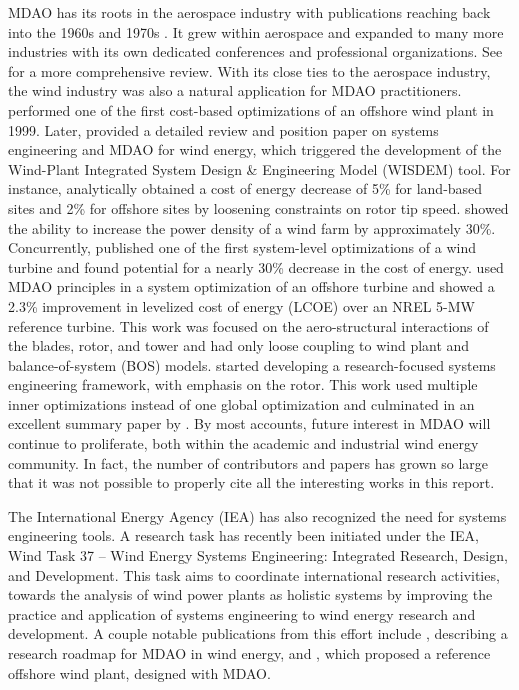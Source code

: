 MDAO has its roots in the aerospace industry with publications reaching
back into the 1960s and 1970s \citep{schmit60, haftka1977}. It grew
within aerospace and expanded to many more industries with its own
dedicated conferences and professional organizations. See
\citet{martins2013} for a more comprehensive review. With its close ties
to the aerospace industry, the wind industry was also a natural
application for MDAO practitioners. \citet{kuhn99} performed one of the
first cost-based optimizations of an offshore wind plant in 1999. Later,
\citet{dykes2011} provided a detailed review and position paper on
systems engineering and MDAO for wind energy, which triggered the
development of the Wind-Plant Integrated System Design \& Engineering
Model (WISDEM) tool. For instance, \citet{ning2014} analytically
obtained a cost of energy decrease of 5\% for land-based sites and 2\%
for offshore sites by loosening constraints on rotor tip
speed. \citet{fleming2016} showed the ability to increase the power
density of a wind farm by approximately 30\%. Concurrently,
\citet{maki2012} published one of the first system-level optimizations
of a wind turbine and found potential for a nearly 30\% decrease in the
cost of energy. \citet{ashuri2014} used MDAO principles in a system
optimization of an offshore turbine and showed a 2.3\% improvement in
levelized cost of energy (LCOE) over an NREL 5-MW reference
turbine. This work was focused on the aero-structural interactions of
the blades, rotor, and tower and had only loose coupling to wind plant
and balance-of-system (BOS) models.  \citet{bottasso2012} started
developing a research-focused systems engineering framework, with
emphasis on the rotor.  This work used multiple inner optimizations
instead of one global optimization and culminated in an excellent
summary paper by \citet{bortolotti2016}.  By most accounts, future
interest in MDAO will continue to proliferate, both within the academic
and industrial wind energy community.  In fact, the number of
contributors and papers has grown so large that it was not possible to
properly cite all the interesting works in this report.

The International Energy Agency (IEA) has also recognized the need for
systems engineering tools. A research task has recently been initiated
under the IEA, Wind Task 37 – Wind Energy Systems Engineering:
Integrated Research, Design, and Development.  This task aims to
coordinate international research activities, towards the analysis of
wind power plants as holistic systems by improving the practice and
application of systems engineering to wind energy research and
development.  A couple notable publications from this effort include
\citet{perez2016}, describing a research roadmap for MDAO in wind
energy, and \citet{perez2018}, which proposed a reference offshore wind
plant, designed with MDAO.

